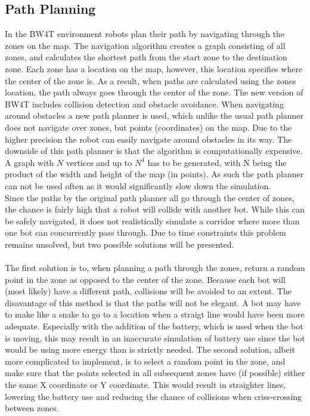 \documentclass{article}
\begin{document}
\subsection*{Path Planning}
In the BW4T environment robots plan their path by navigating through the zones on the map. The navigation algorithm creates a graph consisting of all zones, and calculates the shortest path from the start zone to the destination zone. Each zone has a location on the map, however, this location specifies where the center of the zone is. As a result, when paths are calculated using the zones location, the path always goes through the center of the zone. 
The new version of BW4T includes collision detection and obstacle avoidance. When navigating around obstacles a new path planner is used, which unlike the usual path planner does not navigate over zones, but points (coordinates) on the map. Due to the higher precision the robot can easily navigate around obstacles in its way. The downside of this path planner is that the algorithm is computationally expensive. A graph with $N$ vertices and up to $N^4$ has to be generated, with N being the product of the width and height of the map (in points). As such the path planner can not be used often as it would significantly slow down the simulation. \\
Since the paths by the original path planner all go through the center of zones, the chance is fairly high that a robot will collide with another bot. While this can be safely navigated, it does not realistically simulate a corridor where more than one bot can concurrently pass through. Due to time constraints this problem remains unsolved, but two possible solutions will be presented. \\
\\
The first solution is to, when planning a path through the zones, return a random point in the zone as opposed to the center of the zone. Because each bot will (most likely) have a different path, collisions will be avoided to an extent. The disavantage of this method is that the paths will not be elegant. A bot may have to make like a snake to go to a location when a straigt line would have been more adequate. Especially with the addition of the battery, which is used when the bot is moving, this may result in an inaccurate simulation of battery use since the bot would be using more energy than is strictly	 needed.
The second solution, albeit more complicated to implement, is to select a random point in the zone, and make sure that the points selected in all subsequent zones have (if possible) either the same X coordinate or Y coordinate. This would result in straighter lines, lowering the battery use and reducing the chance of collisions when criss-crossing between zones. 
\end{document}
